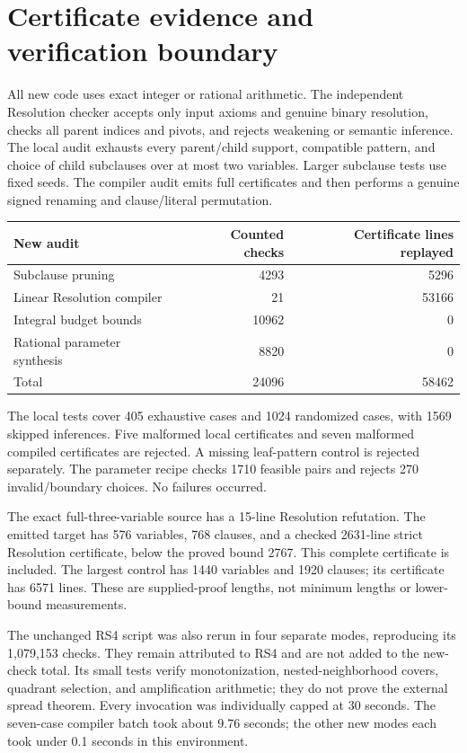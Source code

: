 \documentclass[11pt]{article}
\begin{document}
\section{Certificate evidence and verification boundary}
All new code uses exact integer or rational arithmetic. The independent
Resolution checker accepts only input axioms and genuine binary resolution,
checks all parent indices and pivots, and rejects weakening or semantic
inference. The local audit exhausts every parent/child support, compatible
pattern, and choice of child subclauses over at most two variables. Larger
subclause tests use fixed seeds. The compiler audit emits full certificates
and then performs a genuine signed renaming and clause/literal permutation.
\begin{center}\small
\begin{tabular}{lrr}\toprule
New audit & Counted checks & Certificate lines replayed\\\midrule
Subclause pruning &4293&5296\\
Linear Resolution compiler &21&53166\\
Integral budget bounds &10962&0\\
Rational parameter synthesis &8820&0\\\midrule
Total &24096&58462\\\bottomrule
\end{tabular}
\end{center}
The local tests cover 405 exhaustive cases and 1024 randomized cases, with
1569 skipped inferences. Five malformed local certificates and seven
malformed compiled certificates are rejected. A missing leaf-pattern control
is rejected separately. The parameter recipe checks 1710 feasible pairs and
rejects 270 invalid/boundary choices. No failures occurred.

The exact full-three-variable source has a 15-line Resolution refutation.
The emitted target has 576 variables, 768 clauses, and a checked 2631-line
strict Resolution certificate, below the proved bound 2767. This complete
certificate is included. The largest control has 1440 variables and 1920
clauses; its certificate has 6571 lines. These are supplied-proof lengths,
not minimum lengths or lower-bound measurements.

The unchanged RS4 script was also rerun in four separate modes, reproducing
its 1,079,153 checks. They remain attributed to RS4 and are not added to the
new-check total. Its small tests verify monotonization, nested-neighborhood
covers, quadrant selection, and amplification arithmetic; they do not prove
the external spread theorem. Every invocation was individually capped at
30 seconds. The seven-case compiler batch took about 9.76 seconds; the other
new modes each took under 0.1 seconds in this environment.
\end{document}
